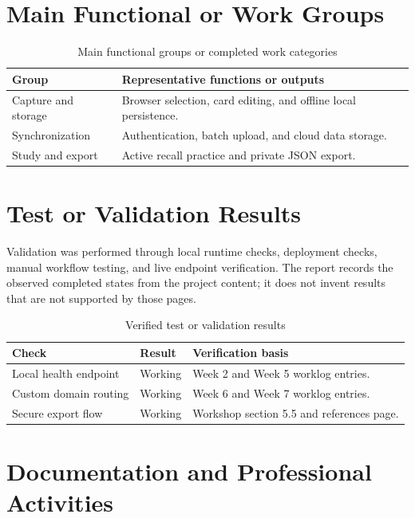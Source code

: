 \section{Main Functional or Work Groups}

\begin{table}[H]
  \centering
  \caption{Main functional groups or completed work categories}
  \begin{tabularx}{\textwidth}{@{}P{4.0cm}Y@{}}
    \toprule
    \textbf{Group} & \textbf{Representative functions or outputs} \\
    \midrule
    Capture and storage & Browser selection, card editing, and offline local
    persistence. \\
    Synchronization & Authentication, batch upload, and cloud data storage. \\
    Study and export & Active recall practice and private JSON export. \\
    \bottomrule
  \end{tabularx}
\end{table}

\section{Test or Validation Results}

Validation was performed through local runtime checks, deployment checks,
manual workflow testing, and live endpoint verification. The report records the
observed completed states from the project content; it does not invent results
that are not supported by those pages.

\begin{table}[H]
  \centering
  \caption{Verified test or validation results}
  \begin{tabularx}{\textwidth}{@{}YP{3.0cm}Y@{}}
    \toprule
    \textbf{Check} & \textbf{Result} & \textbf{Verification basis} \\
    \midrule
    Local health endpoint & Working & Week 2 and Week 5 worklog entries. \\
    Custom domain routing & Working & Week 6 and Week 7 worklog entries. \\
    Secure export flow & Working & Workshop section 5.5 and references page. \\
    \bottomrule
  \end{tabularx}
\end{table}

\section{Documentation and Professional Activities}

